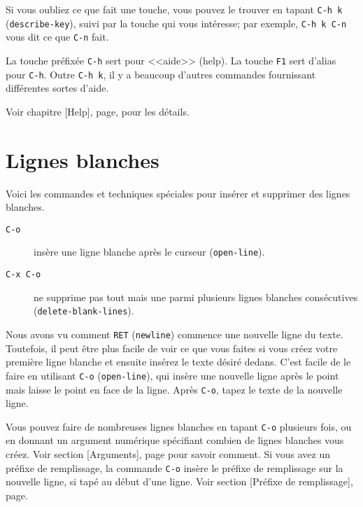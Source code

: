 Si vous oubliez ce que fait une touche, vous pouvez le trouver en tapant
\texttt{C-h k} (\texttt{describe-key}), suivi par la touche qui vous
intéresse; par exemple, \texttt{C-h k C-n} vous dit ce que
\texttt{C-n} fait.\par

La touche préfixée \texttt{C-h} sert pour <<aide>> (help). La touche
\texttt{F1} sert d'alias pour \texttt{C-h}. Outre \texttt{C-h k}, il y
a beaucoup d'autres commandes fournissant différentes sortes
d'aide.\par

Voir chapitre [Help], page, pour les détails.\par

\section{Lignes blanches}

Voici les commandes et techniques spéciales pour insérer et supprimer
des lignes blanches.\par

\begin{description}
\item[\texttt{C-o}] insère une ligne blanche après le curseur
  (\texttt{open-line}). 
\item[\texttt{C-x C-o}] ne supprime pas tout mais une parmi plusieurs lignes
  blanches consécutives (\texttt{delete-blank-lines}).
\end{description}

Nous avons vu comment \texttt{RET} (\texttt{newline}) commence une
nouvelle ligne du texte. Toutefois, il peut être plus facile de voir
ce que vous faites si vous créez votre première ligne blanche et
ensuite insérez le texte désiré dedans. C'est facile de le faire en
utilisant \texttt{C-o} (\texttt{open-line}), qui insère une nouvelle
ligne après le point mais laisse le point en face de la ligne. Après
\texttt{C-o}, tapez le texte de la nouvelle ligne.\par

Vous pouvez faire de nombreuses lignes blanches en tapant \texttt{C-o}
plusieurs fois, ou en donnant un argument numérique spécifiant combien
de lignes blanches vous créez. Voir section [Arguments],
page pour savoir comment. Si vous avez un préfixe de remplissage,
la commande \texttt{C-o} insère le préfixe de remplissage sur la nouvelle
ligne, si tapé au début d'une ligne. Voir section
[Préfixe de remplissage], page.\par

